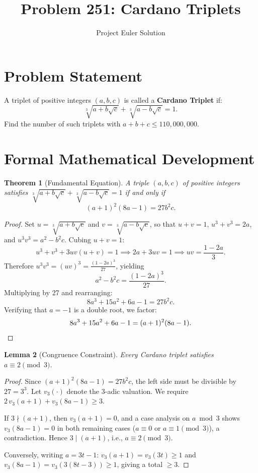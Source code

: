 \documentclass[12pt]{article}
\title{Problem 251: Cardano Triplets}
\author{Project Euler Solution}
\date{}
\newtheorem{theorem}{Theorem}
\newtheorem{lemma}[theorem]{Lemma}
\begin{document}
\maketitle

\section{Problem Statement}
A triplet of positive integers $(a, b, c)$ is called a \textbf{Cardano Triplet} if:
\[
\sqrt[3]{a + b\sqrt{c}} + \sqrt[3]{a - b\sqrt{c}} = 1.
\]
Find the number of such triplets with $a + b + c \leq 110{,}000{,}000$.

\section{Formal Mathematical Development}

\begin{theorem}[Fundamental Equation]
A triple $(a,b,c)$ of positive integers satisfies $\sqrt[3]{a + b\sqrt{c}} + \sqrt[3]{a - b\sqrt{c}} = 1$ if and only if
\[
(a+1)^2(8a-1) = 27b^2 c.
\]
\end{theorem}

\begin{proof}
Set $u = \sqrt[3]{a + b\sqrt{c}}$ and $v = \sqrt[3]{a - b\sqrt{c}}$, so that $u + v = 1$, $u^3 + v^3 = 2a$, and $u^3 v^3 = a^2 - b^2 c$. Cubing $u + v = 1$:
\[
u^3 + v^3 + 3uv(u+v) = 1 \implies 2a + 3uv = 1 \implies uv = \frac{1-2a}{3}.
\]
Therefore $u^3 v^3 = (uv)^3 = \frac{(1-2a)^3}{27}$, yielding
\[
a^2 - b^2 c = \frac{(1-2a)^3}{27}.
\]
Multiplying by 27 and rearranging:
\[
8a^3 + 15a^2 + 6a - 1 = 27b^2 c.
\]
Verifying that $a = -1$ is a double root, we factor:
\[
8a^3 + 15a^2 + 6a - 1 = (a+1)^2(8a-1). \qedhere
\]
\end{proof}

\begin{lemma}[Congruence Constraint]
Every Cardano triplet satisfies $a \equiv 2 \pmod{3}$.
\end{lemma}

\begin{proof}
Since $(a+1)^2(8a-1) = 27 b^2 c$, the left side must be divisible by $27 = 3^3$. Let $v_3(\cdot)$ denote the $3$-adic valuation. We require $2\,v_3(a+1) + v_3(8a-1) \ge 3$.

If $3 \nmid (a+1)$, then $v_3(a+1) = 0$, and a case analysis on $a \bmod 3$ shows $v_3(8a-1) = 0$ in both remaining cases ($a \equiv 0$ or $a \equiv 1 \pmod{3}$), a contradiction. Hence $3 \mid (a+1)$, i.e., $a \equiv 2 \pmod{3}$.

Conversely, writing $a = 3t - 1$: $v_3(a+1) = v_3(3t) \ge 1$ and $v_3(8a-1) = v_3(3(8t-3)) \ge 1$, giving a total $\ge 3$.
\end{proof}
\end{document}
